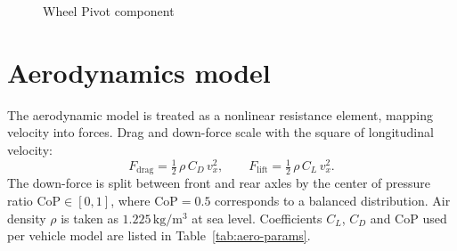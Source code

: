 \begin{figure}[H]
    \centering
    \caption{Wheel Pivot component}\label{fig:wheel_pivot_io}
\end{figure}

\section{Aerodynamics model}
The aerodynamic model is treated as a nonlinear resistance element, mapping velocity into forces. Drag and down-force scale with the square of longitudinal velocity:
\begin{equation}
	F_\text{drag} = \tfrac{1}{2}\,\rho\,C_D\,v_x^2, \qquad
	F_\text{lift} = \tfrac{1}{2}\,\rho\,C_L\,v_x^2.
\end{equation}
The down-force is split between front and rear axles by the center of pressure
ratio $\mathrm{CoP} \in [0,1]$, where $\mathrm{CoP}=0.5$ corresponds to a balanced
distribution. Air density $\rho$ is taken as $1.225\,\mathrm{kg/m^3}$ at sea
level. Coefficients $C_L$, $C_D$ and $\mathrm{CoP}$ used per vehicle model are
listed in Table~\ref{tab:aero-params}.

